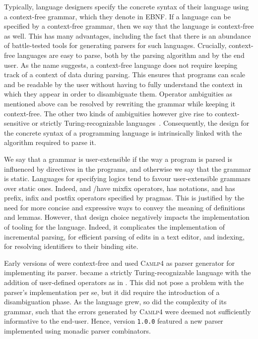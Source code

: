 Typically, language designers specify the concrete syntax of their language using a context-free grammar, which they denote in \ac{EBNF}.
If a language can be specified by a context-free grammar, then we say that the language is context-free as well.
This has many advantages, including the fact that there is an abundance of battle-tested tools for generating parsers for such languages.
Crucially, context-free languages are easy to parse, both by the parsing algorithm and by the end user.
As the name suggests, a context-free language does not require keeping track of a context of data during parsing.
This ensures that programs can scale and be readable by the user without having to fully understand the context in which they appear in order to disambiguate them.
Operator ambiguities as mentioned above can be resolved by rewriting the grammar while keeping it context-free.
The other two kinds of ambiguities however give rise to context-sensitive or strictly Turing-recognizable languages~\cite{chomsky1956three}.
Consequently, the design for the concrete syntax of a programming language is intrinsically linked with the algorithm required to parse it.


We say that a grammar is user-extensible if the way a program is parsed is influenced by directives in the programs, and otherwise we say that the grammar is static.
Languages for specifying logics tend to favour user-extensible grammars over static ones.
Indeed, \Agda and \Isabelle/\HOL have mixfix operators, \Coq has notations, and \Beluga has prefix, infix and postfix operators specified by pragmas.
This is justified by the need for more concise and expressive ways to convey the meaning of definitions and lemmas.
However, that design choice negatively impacts the implementation of tooling for the language.
Indeed, it complicates the implementation of incremental parsing, for efficient parsing of edits in a text editor, and indexing, for resolving identifiers to their binding site.

Early versions of \Beluga were context-free and used \textsc{Camlp4} as parser generator for implementing its parser.
\Beluga became a strictly Turing-recognizable language with the addition of user-defined operators as in \Twelf.
This did not pose a problem with the parser's implementation per se, but it did require the introduction of a disambiguation phase.
As the \Beluga language grew, so did the complexity of its grammar, such that the errors generated by \textsc{Camlp4} were deemed not sufficiently informative to the end-user.
Hence, \Beluga version \texttt{1.0.0} featured a new parser implemented using monadic parser combinators.

